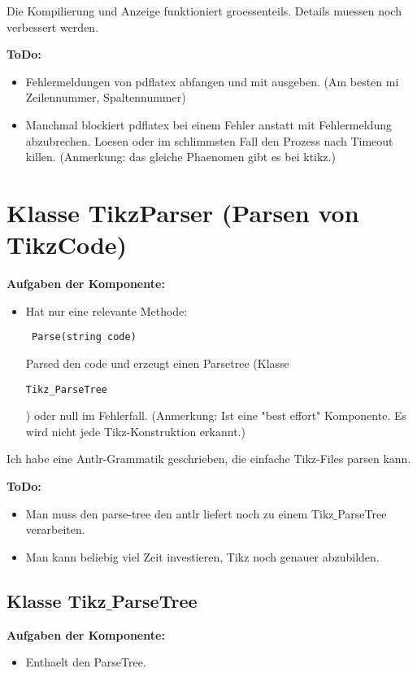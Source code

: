 \documentclass{article}
\begin{document}
Die Kompilierung und Anzeige funktioniert groessenteils. Details muessen noch verbessert werden.

      {\bf  ToDo:}
\begin{itemize}
       \item Fehlermeldungen von pdflatex abfangen und mit ausgeben. (Am besten mi Zeilennummer, Spaltennummer)
        \item Manchmal blockiert pdflatex bei einem Fehler anstatt mit Fehlermeldung abzubrechen.  Loesen oder im schlimmsten Fall den Prozess nach Timeout killen. (Anmerkung: das gleiche Phaenomen gibt es bei ktikz.)
\end{itemize}

  \section{Klasse TikzParser (Parsen von TikzCode)}

     {\bf Aufgaben der Komponente:}
\begin{itemize}
    \item Hat nur eine relevante Methode:\begin{verbatim} Parse(string code)\end{verbatim} Parsed den code und erzeugt einen Parsetree (Klasse  \begin{verbatim}Tikz_ParseTree\end{verbatim}) oder null im Fehlerfall. (Anmerkung: Ist eine "best effort" Komponente. Es wird nicht jede Tikz-Konstruktion erkannt.)
\end{itemize}

Ich habe eine Antlr-Grammatik geschrieben, die einfache Tikz-Files parsen kann.

      {\bf  ToDo:}
\begin{itemize}
       \item  Man muss den parse-tree den antlr liefert noch zu einem  Tikz$\_$ParseTree verarbeiten.
        \item Man kann beliebig viel Zeit investieren, Tikz noch genauer abzubilden.
\end{itemize}

\subsection{Klasse Tikz$\_$ParseTree }
     {\bf Aufgaben der Komponente:}
\begin{itemize}
    \item Enthaelt den ParseTree.
\end{itemize}
\end{document}
